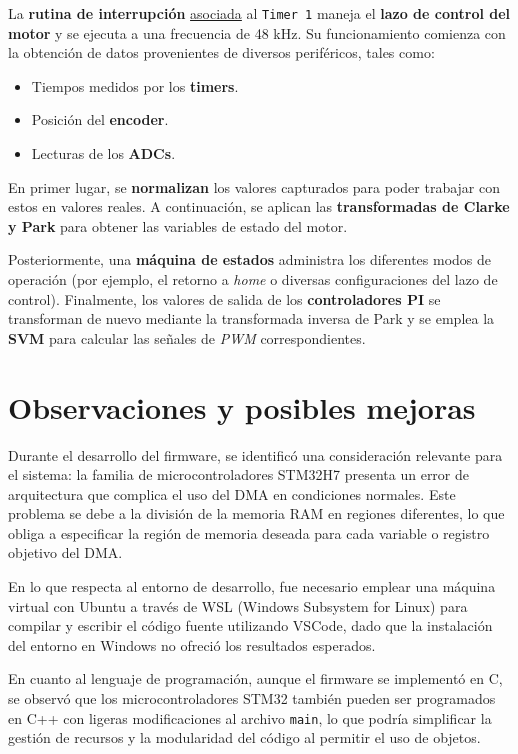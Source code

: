 \documentclass[11pt]{report}
\begin{document}
La \textbf{rutina de interrupción} \href{https://www.youtube.com/watch?v=RJX_jYm8T84}{asociada} al \texttt{Timer 1} maneja el \textbf{lazo de control del motor} y se ejecuta a una frecuencia de 48 kHz. Su funcionamiento comienza con la obtención de datos provenientes de diversos periféricos, tales como:
\begin{itemize}
	\item Tiempos medidos por los \textbf{timers}.
	\item Posición del \textbf{encoder}.
	\item Lecturas de los \textbf{ADCs}.
\end{itemize}
En primer lugar, se \textbf{normalizan} los valores capturados para poder trabajar con estos en valores reales. A continuación, se aplican las \textbf{transformadas de Clarke y Park} para obtener las variables de estado del motor.

Posteriormente, una \textbf{máquina de estados} administra los diferentes modos de operación (por ejemplo, el retorno a \emph{home} o diversas configuraciones del lazo de control). Finalmente, los valores de salida de los \textbf{controladores PI} se transforman de nuevo mediante la transformada inversa de Park y se emplea la \textbf{SVM} para calcular las señales de \emph{PWM} correspondientes.

\newpage
\section{Observaciones y posibles mejoras}

Durante el desarrollo del firmware, se identificó una consideración relevante para el sistema: la familia de microcontroladores STM32H7 presenta un error de arquitectura que complica el uso del DMA en condiciones normales. Este problema se debe a la división de la memoria RAM en regiones diferentes, lo que obliga a especificar la región de memoria deseada para cada variable o registro objetivo del DMA.

En lo que respecta al entorno de desarrollo, fue necesario emplear una máquina virtual con Ubuntu a través de WSL (Windows Subsystem for Linux) para compilar y escribir el código fuente utilizando VSCode, dado que la instalación del entorno en Windows no ofreció los resultados esperados.

En cuanto al lenguaje de programación, aunque el firmware se implementó en C, se observó que los microcontroladores STM32 también pueden ser programados en C++ con ligeras modificaciones al archivo \texttt{main}, lo que podría simplificar la gestión de recursos y la modularidad del código al permitir el uso de objetos.
\end{document}
